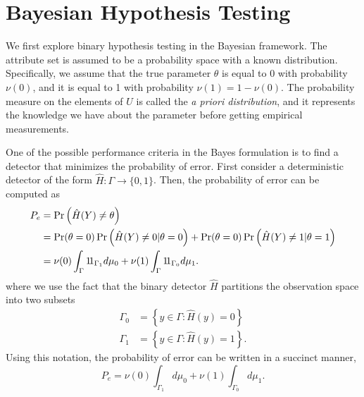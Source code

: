 \section{Bayesian Hypothesis Testing}

We first explore binary hypothesis testing in the Bayesian framework.
The attribute set is assumed to be a probability space with a known distribution.
Specifically, we assume that the true parameter $\theta$ is equal to 0 with probability $\nu(0)$, and it is equal to 1 with probability $\nu(1) = 1 - \nu(0)$.
The probability measure on the elements of $U$ is called the \emph{a priori distribution}, and it represents the knowledge we have about the parameter before getting empirical measurements.

One of the possible performance criteria in the Bayes formulation is to find a detector that minimizes the probability of error.
First consider a deterministic detector of the form $\hat{H}: \Gamma \rightarrow \{ 0, 1 \}$.
Then, the probability of error can be computed as
\begin{equation} \label{equation:ErrorProbabilityDetection}
\begin{split}
P_e &=  \Pr \left( \hat{H}(Y) \neq \theta \right) \\
&= \Pr (\theta = 0 ) \Pr \left( \hat{H}(Y) \neq 0 | \theta = 0 \right)
+ \Pr (\theta = 0 ) \Pr \left( \hat{H}(Y) \neq 1 | \theta = 1 \right) \\
&=  \nu(0) \int_{ \Gamma } \mathrm{1\!1}_{ \Gamma_1 } d\mu_0
+ \nu(1) \int_{ \Gamma } \mathrm{1\!1}_{ \Gamma_0 } d\mu_1 .
\end{split}
\end{equation}
where we use the fact that the binary detector $\hat{H}$ partitions the observation space into two subsets
\begin{align*}
\Gamma_0 &= \left\{ y \in \Gamma : \hat{H} (y) = 0 \right\} \\
\Gamma_1 &= \left\{ y \in \Gamma : \hat{H} (y) = 1 \right\}.
\end{align*}
Using this notation, the probability of error can be written in a succinct manner,
\begin{equation*}
P_e = \nu (0) \int_{\Gamma_1} d\mu_0 + \nu (1) \int_{\Gamma_0} d\mu_1 .
\end{equation*}

